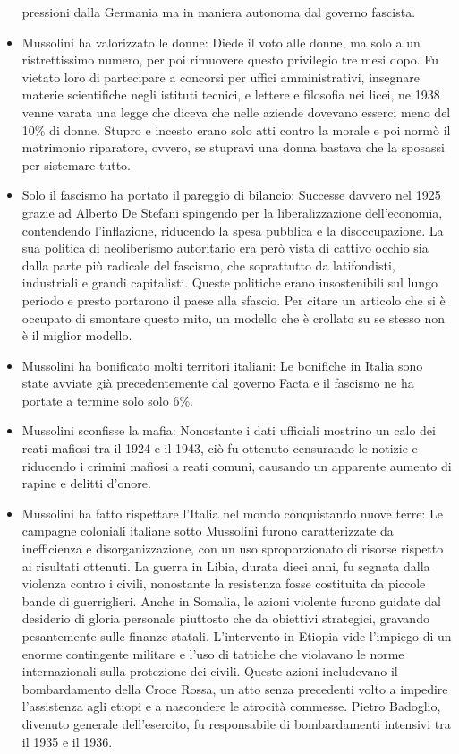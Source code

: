 \documentclass[12pt]{book} %
\begin{document}
\begin{mdframed}[linewidth=1pt]
\begin{itemize}
pressioni dalla Germania ma in maniera autonoma dal governo fascista.
\item Mussolini ha valorizzato le donne: Diede il voto alle donne, ma solo a un ristrettissimo numero, per poi rimuovere
questo privilegio tre mesi dopo. Fu vietato loro di partecipare a concorsi per uffici amministrativi, insegnare materie
scientifiche negli istituti tecnici, e lettere e filosofia nei licei, ne 1938 venne varata una legge che diceva che
nelle aziende dovevano esserci meno del 10\% di donne. Stupro e incesto erano solo atti contro la morale e poi normò il
matrimonio riparatore, ovvero, se stupravi una donna bastava che la sposassi per sistemare tutto.
\item Solo il fascismo ha portato il pareggio di bilancio: Successe davvero nel 1925 grazie ad Alberto De Stefani
spingendo per la liberalizzazione dell'economia, contendendo l'inflazione, riducendo la spesa pubblica e la
disoccupazione. La sua politica di {\textquotedbl}neoliberismo autoritario{\textquotedbl} era però vista di cattivo
occhio sia dalla parte più radicale del fascismo, che soprattutto da latifondisti, industriali e grandi capitalisti.
Queste politiche erano insostenibili sul lungo periodo e presto portarono il paese alla sfascio. Per citare un
articolo che si è occupato di smontare questo
mito, {\textquotedbl}un modello che è crollato su se stesso non è il miglior modello.{\textquotedbl}
\item Mussolini ha bonificato molti territori italiani: Le bonifiche in Italia sono state avviate già precedentemente
dal governo Facta e il fascismo ne ha portate a termine solo solo 6\%.
\item Mussolini sconfisse la mafia: Nonostante i dati ufficiali mostrino un calo dei reati mafiosi tra il 1924 e il 1943, ciò fu ottenuto censurando le notizie e riducendo i crimini mafiosi a reati comuni, causando un apparente aumento di rapine e delitti d’onore.
\item Mussolini ha fatto rispettare l’Italia nel mondo conquistando nuove terre: Le campagne coloniali italiane sotto Mussolini furono caratterizzate da inefficienza e disorganizzazione, con un uso sproporzionato di risorse rispetto ai risultati ottenuti. La guerra in Libia, durata dieci anni, fu segnata dalla violenza contro i civili, nonostante la resistenza fosse costituita da piccole bande di guerriglieri. Anche in Somalia, le azioni violente furono guidate dal desiderio di gloria personale piuttosto che da obiettivi strategici, gravando pesantemente sulle finanze statali. L'intervento in Etiopia vide l'impiego di un enorme contingente militare e l'uso di tattiche che violavano le norme internazionali sulla protezione dei civili. Queste azioni includevano il bombardamento della Croce Rossa, un atto senza precedenti volto a impedire l'assistenza agli etiopi e a nascondere le atrocità commesse. Pietro Badoglio, divenuto generale dell'esercito, fu responsabile di bombardamenti intensivi tra il 1935 e il 1936.

\end{itemize}
\end{mdframed}
\end{document}

